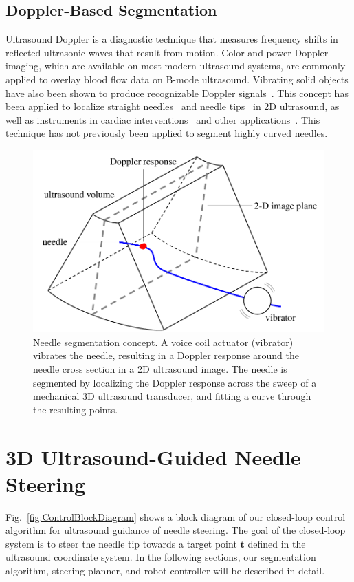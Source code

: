 \subsection{Doppler-Based Segmentation}
Ultrasound Doppler is a diagnostic technique that measures frequency shifts in reflected ultrasonic waves that result from motion. Color and power Doppler imaging, which are available on most modern ultrasound systems, are commonly applied to overlay blood flow data on B-mode ultrasound. Vibrating solid objects have also been shown to produce recognizable Doppler signals~\cite{Holen1985}. This concept has been applied to localize straight needles~\cite{Armstrong2001,Feld1997,Hamper1991} and needle tips~\cite{Harmat2006} in 2D ultrasound, as well as instruments in cardiac interventions~\cite{Fronheiser2008,Reddy2008} and other applications~\cite{McAleavey2003,Rogers2009}. This technique has not previously been applied to segment highly curved needles.

\begin{figure}[!t]
\centering
\includegraphics[width = \columnwidth]{Images/Chapter2/SliceConcept/SliceConcept}%
\caption[short version!!]{Needle segmentation concept. A voice coil actuator (vibrator) vibrates the needle, resulting in a Doppler response around the needle cross section in a 2D ultrasound image. The needle is segmented by localizing the Doppler response across the sweep of a mechanical 3D ultrasound transducer, and fitting a curve through the resulting points.}
\label{fig:SliceConcept}
\end{figure}

\section{3D Ultrasound-Guided Needle Steering}
\label{sec:Algorithms}
Fig.~\ref{fig:ControlBlockDiagram} shows a block diagram of our closed-loop control algorithm for ultrasound guidance of needle steering. The goal of the closed-loop system is to steer the needle tip towards a target point $\bm{t}$ defined in the ultrasound coordinate system. In the following sections, our segmentation algorithm, steering planner, and robot controller will be described in detail. 

